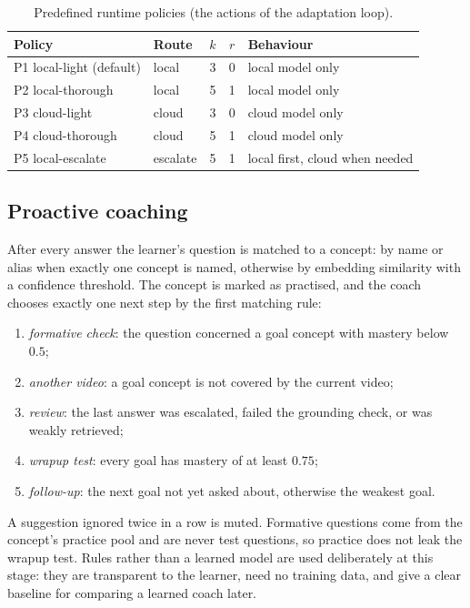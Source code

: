 \begin{table}[htbp]
\centering
\caption{Predefined runtime policies (the actions of the adaptation loop).}
\label{tab:policies}
\begin{tabular}{llccl}
\toprule
Policy & Route & $k$ & $r$ & Behaviour \\
\midrule
P1 local-light (default) & local & 3 & 0 & local model only \\
P2 local-thorough & local & 5 & 1 & local model only \\
P3 cloud-light & cloud & 3 & 0 & cloud model only \\
P4 cloud-thorough & cloud & 5 & 1 & cloud model only \\
P5 local-escalate & escalate & 5 & 1 & local first, cloud when needed \\
\bottomrule
\end{tabular}
\end{table}

\subsection{Proactive coaching}

After every answer the learner's question is matched to a concept: by name or alias when exactly one concept is
named, otherwise by embedding similarity with a confidence threshold. The concept is marked as practised, and the
coach chooses exactly one next step by the first matching rule:
\begin{enumerate}
  \item \emph{formative check}: the question concerned a goal concept with mastery below $0.5$;
  \item \emph{another video}: a goal concept is not covered by the current video;
  \item \emph{review}: the last answer was escalated, failed the grounding check, or was weakly retrieved;
  \item \emph{wrapup test}: every goal has mastery of at least $0.75$;
  \item \emph{follow-up}: the next goal not yet asked about, otherwise the weakest goal.
\end{enumerate}
A suggestion ignored twice in a row is muted. Formative questions come from the concept's practice pool and are never
test questions, so practice does not leak the wrapup test. Rules rather than a learned model are used deliberately at
this stage: they are transparent to the learner, need no training data, and give a clear baseline for comparing a
learned coach later.


